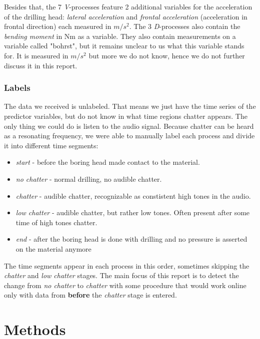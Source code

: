 \documentclass[12 pt]{scrartcl}
\begin{document}
Besides that, the 7 \emph{V}-processes feature 2 additional variables for the acceleration of the drilling head: \emph{lateral acceleration} and \emph{frontal acceleration} (acceleration in frontal direction) each measured in $m/s^2$.
The 3 \emph{D}-processes also contain the \emph{bending moment} in Nm as a variable. They also contain measurements on a variable called "bohrst", but it remains unclear to us what this variable stands for. It is measured in $m/s^2$ but more we do not know, hence we do not further discuss it in this report.

\subsubsection{Labels} \label{labels}

The data we received is unlabeled. That means we just have the time series of the predictor variables, but do not know in what time regions chatter appears. The only thing we could do is listen to the audio signal. Because chatter can be heard as a resonating frequency, we were able to manually label each process and divide it into different time segments:

\begin{itemize}
  \item \emph{start} - before the boring head made contact to the material.
  \item \emph{no chatter} - normal drilling, no audible chatter.
  \item \emph{chatter} - audible chatter, recognizable as constistent high tones in the audio.
  \item \emph{low chatter} - audible chatter, but rather low tones. Often present after some time of high tones chatter.
  \item \emph{end} - after the boring head is done with drilling and no pressure is asserted on the material anymore
\end{itemize}

The time segments appear in each process in this order, sometimes skipping the \emph{chatter} and \emph{low chatter} stages.
The main focus of this report is to detect the change from \emph{no chatter} to \emph{chatter} with some procedure that would work online only with data from \textbf{before} the \emph{chatter} stage is entered.

\section{Methods}
\end{document}
